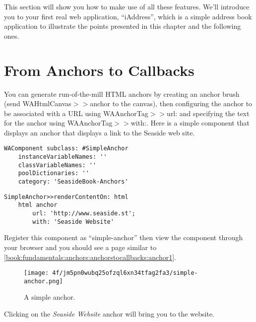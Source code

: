 \documentclass[a4paper,10pt,twoside]{book}
\newcommand{\ct}[1]{{\small\ttfamily\textup{#1}}}
\begin{document}
This section will show you how to make use of all these features. We'll introduce you to your first real web application, ``iAddress'', which is a simple address book application to illustrate the points presented in this chapter and the following ones. 

\section{From Anchors to Callbacks}
\label{book:fundamentals:anchors:anchorstocallbacks}

You can generate run-of-the-mill HTML anchors by creating an anchor brush (send  \ct{WAHtmlCanvas$>$$>$anchor} to the canvas), then configuring the anchor to be associated with a URL using  \ct{WAAnchorTag$>$$>$url:} and specifying the text for the anchor using \ct{WAAnchorTag$>$$>$with:}. Here is a simple component that displays an anchor that displays a link to the Seaside web site.

\begin{lstlisting}
WAComponent subclass: #SimpleAnchor
    instanceVariableNames: ''
    classVariableNames: ''
    poolDictionaries: ''
    category: 'SeasideBook-Anchors'
\end{lstlisting}

\begin{lstlisting}
SimpleAnchor>>renderContentOn: html
    html anchor
        url: 'http://www.seaside.st';
        with: 'Seaside Website'
\end{lstlisting}

Register this component as ``simple-anchor'' then view the component through your browser and you should see a page similar to \autoref{book:fundamentals:anchors:anchorstocallbacks:anchor1}.

\begin{figure}[h!tbp]
	\begin{center}
		\texttt{[image: 4f/jm5pn0wubq25ofzql6xn34tfag2fa3/simple-anchor.png]}
		\caption{A simple anchor.\label{book:fundamentals:anchors:anchorstocallbacks:anchor1}}
	\end{center}
\end{figure}


Clicking on the \textit{Seaside Website} anchor will bring you to the website.

\end{document}
